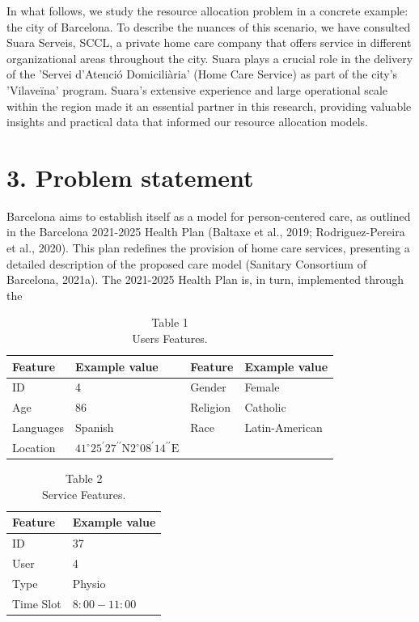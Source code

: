 \documentclass[10pt]{article}
\begin{document}
In what follows, we study the resource allocation problem in a concrete example: the city of Barcelona. To describe the nuances of this scenario, we have consulted Suara Serveis, SCCL, a private home care company that offers service in different organizational areas throughout the city. Suara plays a crucial role in the delivery of the 'Servei d'Atenció Domiciliària' (Home Care Service) as part of the city's 'Vilaveïna' program. Suara's extensive experience and large operational scale within the region made it an essential partner in this research, providing valuable insights and practical data that informed our resource allocation models.

\section*{3. Problem statement}
Barcelona aims to establish itself as a model for person-centered care, as outlined in the Barcelona 2021-2025 Health Plan (Baltaxe et al., 2019; Rodriguez-Pereira et al., 2020). This plan redefines the provision of home care services, presenting a detailed description of the proposed care model (Sanitary Consortium of Barcelona, 2021a). The 2021-2025 Health Plan is, in turn, implemented through the

\begin{table}[h]
\begin{center}
\captionsetup{labelformat=empty}
\caption{Table 1\\
Users Features.}
\begin{tabular}{|l|l|l|l|}
\hline
Feature & Example value & Feature & Example value \\
\hline
ID & 4 & Gender & Female \\
\hline
Age & 86 & Religion & Catholic \\
\hline
Languages & Spanish & Race & Latin-American \\
\hline
Location & $41^{\circ} 25^{\prime} 27^{\prime \prime} \mathrm{N} 2^{\circ} 08^{\prime} 14^{\prime \prime} \mathrm{E}$ &  &  \\
\hline
\end{tabular}
\end{center}
\end{table}

\begin{table}[h]
\begin{center}
\captionsetup{labelformat=empty}
\caption{Table 2\\
Service Features.}
\begin{tabular}{ll}
\hline
Feature & Example value \\
\hline
ID & 37 \\
User & 4 \\
Type & Physio \\
Time Slot & $8: 00-11: 00$ \\
\hline
\end{tabular}
\end{center}
\end{table}
\end{document}
